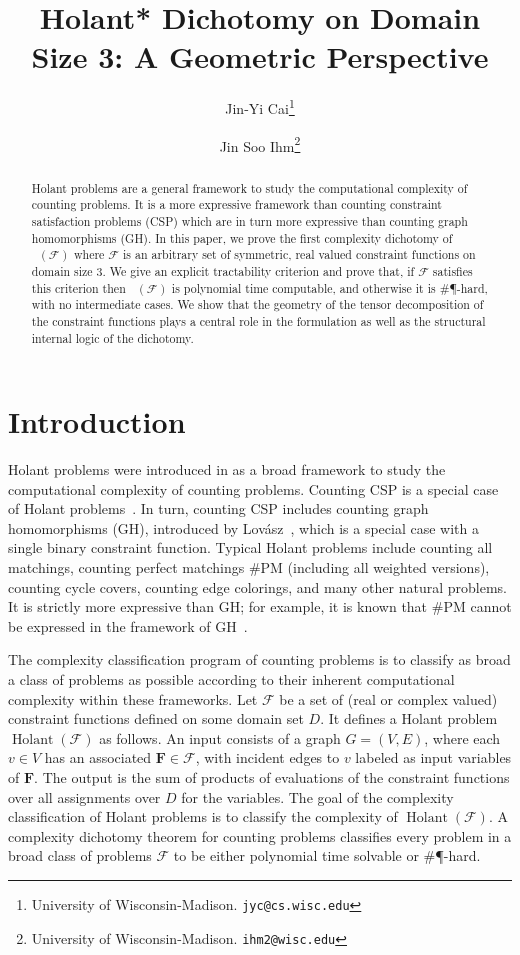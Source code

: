 \documentclass[11pt]{article}
\title{
Holant* Dichotomy on Domain Size 3: A Geometric Perspective
}
\author{Jin-Yi Cai\thanks{University of Wisconsin-Madison. {\tt jyc@cs.wisc.edu}}
\and Jin Soo Ihm\thanks{University of Wisconsin-Madison.
{\tt ihm2@wisc.edu}}}
\DeclareMathOperator{\hol}{Holant}
\DeclareMathOperator{\holts}{Holant^*_3}
\newcommand{\sph}{\#\P-hard\xspace}
\begin{document}
\date{}
\maketitle
\begin{abstract}
Holant problems are a general framework to study the computational complexity of counting problems. It is a more expressive framework than
counting constraint satisfaction problems (CSP) which are in turn
more expressive than counting graph homomorphisms (GH).
In this paper, we prove the first complexity dichotomy of $\holts(\mathcal{F})$ where $\mathcal{F}$ is an arbitrary set of symmetric, real valued constraint functions on domain size $3$.
We give an explicit tractability criterion
and prove that, if  $\mathcal{F}$ satisfies  this  
 criterion
 then $\holts(\mathcal{F})$ is   polynomial time
computable, and otherwise it is  \sph, with no intermediate cases. 
We show that the geometry of the tensor decomposition of the constraint functions 
plays a central role in the formulation as well as the
structural internal logic of the dichotomy.
\end{abstract}

\section{Introduction}
Holant problems were introduced in \cite{cai_computational_2011} as a broad framework to study the computational complexity of counting problems.
Counting CSP  is a special case of Holant problems~\cite{Creignou1996ComplexityOG, bulatov-dalmau-csp, 10.1145/2528400, doi:10.1137/070690201, 10.1145/1536414.1536511, DBLP:journals/siamcomp/DyerR13, 5959820, Cai2011ComplexityOC}.
In turn, counting CSP includes counting graph homomorphisms (GH),
introduced by Lov\'asz~\cite{Lovsz1967OperationsWS, Hell2004GraphsAH},
which is a special case with a single binary constraint function.
Typical Holant problems include counting all matchings, counting
perfect matchings \#PM (including all weighted versions), counting cycle
covers, counting edge colorings, and many other natural problems.
It is strictly more expressive than GH; for example, it is known that
\#PM cannot be expressed in the framework of GH~\cite{Freedman2004ReflectionPR,DBLP:journals/cpc/CaiG22}.


The complexity classification program of counting problems is to classify as broad a class of  problems as possible
according to their inherent computational complexity within these
frameworks.
Let $\mathcal{F}$ be a set of (real or complex valued) constraint functions defined on some domain set $D$.
It defines a Holant problem $\hol(\mathcal{F})$ as follows.
An input consists of a graph $G = (V, E)$, where each $v \in V$ has an associated $\mathbf{F} \in \mathcal{F}$, with incident edges to $v$ labeled as input variables of $\mathbf{F}$.
The output is the sum of products of evaluations of the constraint functions over all assignments over $D$ for the variables.
The goal of the complexity classification of Holant problems is to classify the complexity of $\hol(\mathcal{F})$.
A complexity dichotomy theorem for counting problems classifies every problem
in a broad class of problems $\mathcal{F}$ 
to be either polynomial time solvable or \sph.
\end{document}
